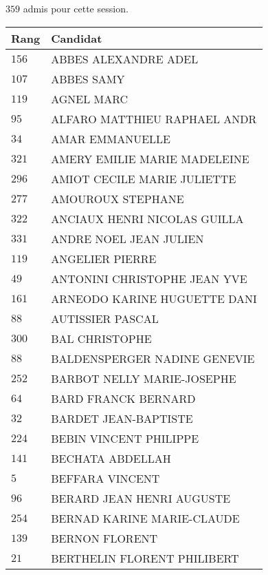 




  $359$ admis pour cette session.

  \begin{xltabular}{\linewidth}{|l|X|}
    \hline
    \textbf{Rang} & \textbf{Candidat} \\
    \hline
    $156$ & ABBES ALEXANDRE ADEL \\
    \hline
    $107$ & ABBES SAMY \\
    \hline
    $119$ & AGNEL MARC \\
    \hline
    $95$ & ALFARO MATTHIEU RAPHAEL ANDR \\
    \hline
    $34$ & AMAR EMMANUELLE \\
    \hline
    $321$ & AMERY EMILIE MARIE MADELEINE \\
    \hline
    $296$ & AMIOT CECILE MARIE JULIETTE \\
    \hline
    $277$ & AMOUROUX STEPHANE \\
    \hline
    $322$ & ANCIAUX HENRI NICOLAS GUILLA \\
    \hline
    $331$ & ANDRE NOEL JEAN JULIEN \\
    \hline
    $119$ & ANGELIER PIERRE \\
    \hline
    $49$ & ANTONINI CHRISTOPHE JEAN YVE \\
    \hline
    $161$ & ARNEODO KARINE HUGUETTE DANI \\
    \hline
    $88$ & AUTISSIER PASCAL \\
    \hline
    $300$ & BAL CHRISTOPHE \\
    \hline
    $88$ & BALDENSPERGER NADINE GENEVIE \\
    \hline
    $252$ & BARBOT NELLY MARIE-JOSEPHE \\
    \hline
    $64$ & BARD FRANCK BERNARD \\
    \hline
    $32$ & BARDET JEAN-BAPTISTE \\
    \hline
    $224$ & BEBIN VINCENT PHILIPPE \\
    \hline
    $141$ & BECHATA ABDELLAH \\
    \hline
    $5$ & BEFFARA VINCENT \\
    \hline
    $96$ & BERARD JEAN HENRI AUGUSTE \\
    \hline
    $254$ & BERNAD KARINE MARIE-CLAUDE \\
    \hline
    $139$ & BERNON FLORENT \\
    \hline
    $21$ & BERTHELIN FLORENT PHILIBERT \\

\end{xltabular}
